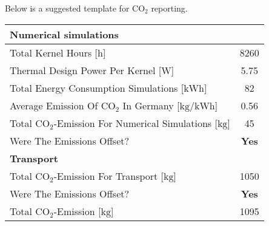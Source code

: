\documentclass[]{article}
\begin{document}
Below is a suggested template for CO$_2$ reporting.

\begin{center}
\begin{tabular}[b]{l c}
\hline
\textbf{Numerical simulations} & \\
\hline
Total Kernel Hours [$\mathrm{h}$]& 8260\\
Thermal Design Power Per Kernel [$\mathrm{W}$]& 5.75\\
Total Energy Consumption Simulations [$\mathrm{kWh}$] & 82\\
Average Emission Of CO$_2$ In Germany [$\mathrm{kg/kWh}$]& 0.56\\
Total CO$_2$-Emission For Numerical Simulations [$\mathrm{kg}$] & 45\\
Were The Emissions Offset? & \textbf{Yes}\\
\hline
\textbf{Transport} & \\
\hline
Total CO$_2$-Emission For Transport [$\mathrm{kg}$] & 1050\\
Were The Emissions Offset? & \textbf{Yes}\\
\hline
Total CO$_2$-Emission [$\mathrm{kg}$] & 1095\\
\hline
\hline
\end{tabular}
\end{center}
\end{document}
